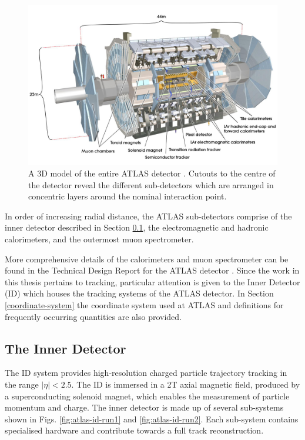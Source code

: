 \begin{figure}[htb!]
\includegraphics[width=\textwidth]{images/2-LHC-ATLAS/atlas_detector.jpg}
\caption{A 3D model of the entire ATLAS detector \cite{Jon-And:1237407}. Cutouts to the centre of the detector reveal the different sub-detectors which are arranged in concentric layers around the nominal interaction point.}
\label{fig: atlas-detector}
\end{figure}

In order of increasing radial distance, the ATLAS sub-detectors comprise of the inner detector described in Section \ref{inner-detector}, the electromagnetic and hadronic calorimeters, and the outermost muon spectrometer. 

More comprehensive details of the calorimeters and muon spectrometer can be found in the Technical Design Report for the ATLAS detector \cite{inner-detector-TDR}. Since the work in this thesis pertains to tracking, particular attention is given to the Inner Detector (ID) which houses the tracking systems of the ATLAS detector. In Section \ref{coordinate-system} the coordinate system used at ATLAS and definitions for frequently occurring quantities are also provided.



\subsection{The Inner Detector}
\label{inner-detector}

The ID system provides high-resolution charged particle trajectory tracking in the range $ \lvert \eta \rvert < 2.5$. The ID is immersed in a 2T axial magnetic field, produced by a superconducting solenoid magnet, which enables the measurement of particle momentum and charge. The inner detector is made up of several sub-systems shown in Figs. \ref{fig:atlas-id-run1} and \ref{fig:atlas-id-run2}. Each sub-system contains specialised hardware and contribute towards a full track reconstruction. 

